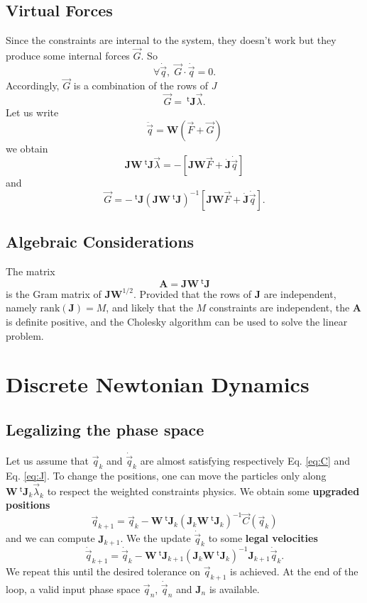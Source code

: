 \documentclass[aps,twocolumn]{revtex4}
\newcommand{\mymat}[1]{\boldsymbol{#1}}
\newcommand{\mytrn}[1]{{\!\!~^{\mathsf{t}}{#1}}}
\newcommand{\q}{\vec{q}}
\newcommand{\dq}{\dot{\q}}
\newcommand{\ddq}{\ddot{\q}}
\newcommand{\C}{\vec{C}}
\newcommand{\J}{\mymat{J}}
\newcommand{\dJ}{\dot{\J}}
\newcommand{\tJ}{\mytrn{\J}}
\newcommand{\G}{\vec{G}}
\newcommand{\W}{\mymat{W}}
\newcommand{\A}{\mymat{A}}
\begin{document}
\subsection{Virtual Forces}
Since the constraints are internal to the system, they doesn't work but they produce some internal
forces $\G$. So
\begin{equation}
\forall \dq, \; \G\cdot\dq = 0.
\end{equation}
Accordingly, $\G$ is a combination of the rows of $J$
\begin{equation}
	\G = \tJ \vec{\lambda}.
\end{equation}
Let us write
\begin{equation}
	\ddq = \W \left( \vec{F} + \G \right)
\end{equation}
we obtain
\begin{equation}
	\J \W \tJ \vec{\lambda} = -\left\lbrack \J\W\vec{F} + \dJ \dq \right\rbrack
\end{equation}
and
\begin{equation}
	\G = - \tJ \left(\J \W \tJ \right)^{-1}\left\lbrack \J\W\vec{F} + \dJ \dq \right\rbrack.
\end{equation}

\subsection{Algebraic Considerations}
The matrix
\begin{equation}
	\A  = \J \W \tJ 
\end{equation}
is the Gram matrix of $\J\W^{1/2}$.
Provided that the rows of $\J$ are independent, namely $\text{rank}(\J)=M$, and likely that the $M$ constraints are independent, 
the $\A$ is definite positive, and the Cholesky algorithm can be used to solve the linear problem.

\section{Discrete Newtonian Dynamics}

\subsection{Legalizing the phase space}
Let us assume that $\q_k$ and $\dq_{k}$ are almost satisfying respectively Eq. \eqref{eq:C} and Eq. \eqref{eq:J}.
To change the positions, one can move the particles only along $\W\tJ_k \vec{\lambda}_k$ to respect the weighted constraints physics.
We obtain some \textbf{upgraded positions}
\begin{equation}
	\label{eq:legal_q}
	\q_{k+1} = \q_k - \W \tJ_k \left(\J_k \W \tJ_k \right)^{-1} \C(\q_k)
\end{equation}
and we can compute $\J_{k+1}$.
We the update $\dq_k$ to some \textbf{legal velocities}
\begin{equation}
	\label{eq:legal_dq}
	\dq_{k+1} = \dq_k - \W\tJ_{k+1} \left(\J_k \W \tJ_k \right)^{-1} \J_{k+1} \dq_k.
\end{equation}
We repeat this until the desired tolerance on $\q_{k+1}$ is achieved.
At the end of the loop, a valid input phase space $\q_{n}$, $\dq_{n}$ and $\J_n$ is available.
\end{document}
